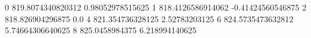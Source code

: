 0 819.8074340820312 0.98052978515625
1 818.4126586914062 -0.41424560546875
2 818.826904296875 0.0
4 821.354736328125 2.52783203125
6 824.5735473632812 5.74664306640625
8 825.0458984375 6.218994140625
